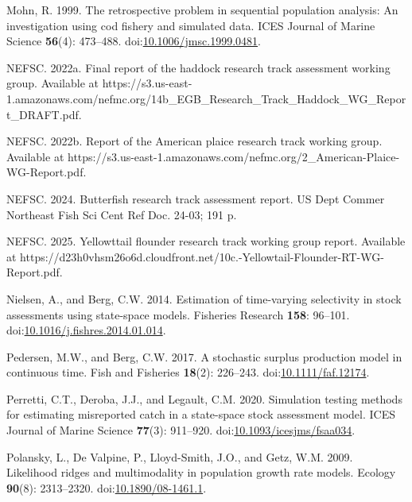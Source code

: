 \documentclass[
  12pt,
]{article}
\newlength{\cslhangindent}
\newlength{\cslentryspacingunit} %
\newenvironment{CSLReferences}[2] %
 {%
  \setlength{\parindent}{0pt}
  \ifodd #1
  \let\oldpar\par
  \def\par{\hangindent=\cslhangindent\oldpar}
  \fi
  \setlength{\parskip}{#2\cslentryspacingunit}
 }%
 {}
\begin{document}
\begin{CSLReferences}{1}{0}
\leavevmode{}%
Mohn, R. 1999. The retrospective problem in sequential population
analysis: An investigation using cod fishery and simulated data. ICES
Journal of Marine Science \textbf{56}(4): 473--488.
doi:\href{https://doi.org/10.1006/jmsc.1999.0481}{10.1006/jmsc.1999.0481}.

\leavevmode{}%
NEFSC. 2022a. Final report of the haddock research track assessment
working group. {Available} at
https://s3.us-east-1.amazonaws.com/nefmc.org/14b\_EGB\_Research\_Track\_Haddock\_WG\_Report\_DRAFT.pdf.

\leavevmode{}%
NEFSC. 2022b. Report of the {A}merican plaice research track working
group. {Available} at
https://s3.us-east-1.amazonaws.com/nefmc.org/2\_American-Plaice-WG-Report.pdf.

\leavevmode{}%
NEFSC. 2024. Butterfish research track assessment report. US Dept Commer
Northeast Fish Sci Cent Ref Doc. 24-03; 191 p.

\leavevmode{}%
NEFSC. 2025. Yellowttail flounder research track working group report.
{Available} at
https://d23h0vhsm26o6d.cloudfront.net/10c.-Yellowtail-Flounder-RT-WG-Report.pdf.

\leavevmode{}%
Nielsen, A., and Berg, C.W. 2014. Estimation of time-varying selectivity
in stock assessments using state-space models. Fisheries Research
\textbf{158}: 96--101.
doi:\href{https://doi.org/10.1016/j.fishres.2014.01.014}{10.1016/j.fishres.2014.01.014}.

\leavevmode{}%
Pedersen, M.W., and Berg, C.W. 2017. A stochastic surplus production
model in continuous time. Fish and Fisheries \textbf{18}(2): 226--243.
doi:\href{https://doi.org/10.1111/faf.12174}{10.1111/faf.12174}.

\leavevmode{}%
Perretti, C.T., Deroba, J.J., and Legault, C.M. 2020. Simulation testing
methods for estimating misreported catch in a state-space stock
assessment model. ICES Journal of Marine Science \textbf{77}(3):
911--920.
doi:\href{https://doi.org/10.1093/icesjms/fsaa034}{10.1093/icesjms/fsaa034}.

\leavevmode{}%
Polansky, L., De Valpine, P., Lloyd-Smith, J.O., and Getz, W.M. 2009.
Likelihood ridges and multimodality in population growth rate models.
Ecology \textbf{90}(8): 2313--2320.
doi:\href{https://doi.org/10.1890/08-1461.1}{10.1890/08-1461.1}.


\end{CSLReferences}
\end{document}
